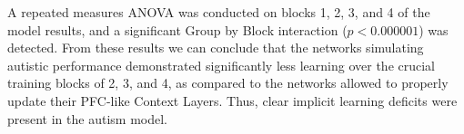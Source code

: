 A repeated measures ANOVA was conducted on blocks 1, 2, 3, and 4 of the model results, and a significant Group by Block interaction ($p < 0.000001$) was detected. From these results we can conclude that the networks simulating autistic performance demonstrated significantly less learning over the crucial training blocks of 2, 3, and 4, as compared to the networks allowed to properly update their PFC-like Context Layers.  Thus, clear implicit learning deficits were present in the autism model.

